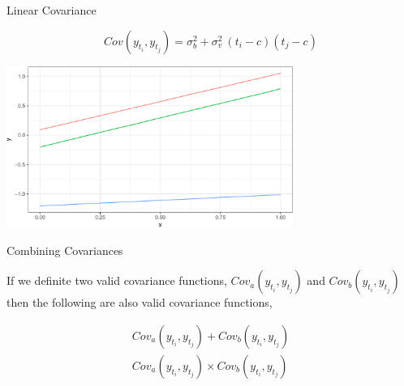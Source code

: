 \documentclass[11pt,ignorenonframetext,]{beamer}
\begin{document}
\begin{frame}[t]{%
\protect\hypertarget{linear-covariance}{%
Linear Covariance}}

\vspace{-5mm}

\[ Cov(y_{t_i}, y_{t_j}) = \sigma^2_b + \sigma^2_v~(t_i-c)(t_j-c)\]

\begin{center}\includegraphics[width=0.7\textwidth]{Lec14_files/figure-beamer/unnamed-chunk-7-1} \end{center}

\end{frame}

\begin{frame}[t]{%
\protect\hypertarget{combining-covariances}{%
Combining Covariances}}

If we definite two valid covariance functions,
\(Cov_a(y_{t_i}, y_{t_j})\) and \(Cov_b(y_{t_i}, y_{t_j})\) then the
following are also valid covariance functions,

\[
\begin{aligned}
Cov_a(y_{t_i}, y_{t_j}) + Cov_b(y_{t_i}, y_{t_j}) \\
Cov_a(y_{t_i}, y_{t_j}) \times Cov_b(y_{t_i}, y_{t_j})
\end{aligned}
\]

\end{frame}
\end{document}
